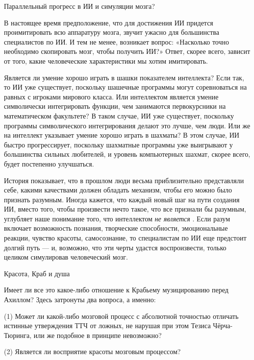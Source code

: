 \documentclass[../main.tex]{subfiles}
\begin{document}
Параллельный прогресс в ИИ и симуляции мозга?

В настоящее время предположение, что для достижения ИИ придется проимитировать всю аппаратуру мозга, звучит ужасно для большинства специалистов по ИИ. И тем не менее, возникает вопрос: «Насколько точно необходимо скопировать мозг, чтобы получить ИИ?» Ответ, скорее всего, зависит от того, какие человеческие характеристики мы хотим имитировать.

Является ли умение хорошо играть в шашки показателем интеллекта? Если так, то ИИ уже существует, поскольку шашечные программы могут соревноваться на равных с игроками мирового класса. Или интеллектом является умение символически интегрировать функции, чем занимаются первокурсники на математическом факультете? В таком случае, ИИ уже существует, поскольку программы символического интегрирования делают это лучше, чем люди. Или же на интеллект указывает умение хорошо играть в шахматы? В этом случае, ИИ быстро прогрессирует, поскольку шахматные программы уже выигрывают у большинства сильных любителей, и уровень компьютерных шахмат, скорее всего, будет постепенно улучшаться.

История показывает, что в прошлом люди весьма приблизительно представляли себе, какими качествами должен обладать механизм, чтобы его можно было признать разумным. Иногда кажется, что каждый новый шаг на пути создания ИИ, вместо того, чтобы произвести нечто такое, что все признали бы разумным, углубляет наше понимание того, что интеллектом \emph{не является} . Если разум включает возможность познания, творческие способности, эмоциональные реакции, чувство красоты, самосознание, то специалистам по ИИ еще предстоит долгий путь --- и, возможно, что эти черты удастся воспроизвести, только целиком симулировав человеческий мозг.

Красота, Краб и душа

Имеет ли все это какое-либо отношение к Крабьему музицированию перед Ахиллом? Здесь затронуты два вопроса, а именно:

(1) Может ли какой-либо мозговой процесс с абсолютной точностью отличать истинные утверждения ТТЧ от ложных, не нарушая при этом Тезиса Чёрча-Тюринга, или же подобное в принципе невозможно?

(2) Является ли восприятие красоты мозговым процессом?
\end{document}

